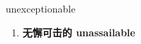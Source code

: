 
\begin{frame}
{\huge unexceptionable}
\begin{center}
\begin{enumerate}\Large
  \item \textbf{无懈可击的 unassailable}
\end{enumerate}
\end{center}
\end{frame}
